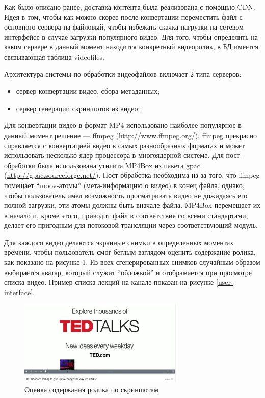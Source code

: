 Как было описано ранее, доставка контента была реализована с помощью CDN.
Идея в том, чтобы как можно скорее после конвертации переместить файл с основного сервера на файловый,
чтобы избежать скачка нагрузки на сетевом интерфейсе в случае загрузки популярного видео.
Для того, чтобы определить на каком сервере в данный момент находится конкретный видеоролик,
в БД имеется связывающая таблица videofiles.

Архитектура системы по обработки видеофайлов включает 2 типа серверов:

\begin{itemize}[wide,topsep=0pt]
  \itemsep0em
  \item сервер конвертации видео, сбора метаданных;
  \item сервер генерации скриншотов из видео;
\end{itemize}

Для конвертации видео в формат MP4 использовано наиболее популярное в данный момент решение — ffmpeg (\url{http://www.ffmpeg.org/}).
ffmpeg прекрасно справляется с конвертацией видео в самых разнообразных форматах и может использовать несколько ядер
процессора в многоядерной системе. Для пост-обработки была использована утилита MP4Box из пакета gpac (\url{http://gpac.sourceforge.net/}).
Пост-обработка необходима из-за того, что ffmpeg помещает “moov-атомы” (мета-информацию о видео) в конец файла, однако,
чтобы пользователь имел возможность просматривать видео не дожидаясь его полной загрузки, эти атомы должны быть
вначале файла. MP4Box перемещает их в начало и, кроме этого, приводит файл в соответствие со всеми стандартами,
делает его пригодным для потоковой трансляции через соответствующий модуль.

Для каждого видео делаются экранные снимки в определенных моментах времени, чтобы пользователь смог беглым взглядом
оценить содержание ролика, как показано на рисунке \ref{thumbnails}. Из всех сгенерированных снимков
случайным образом выбирается аватар, который служит “обложкой” и отображается при просмотре списка видео. Пример списка
лекций на канале показан на рисунке \ref{user-interface}.

\begin{figure}[H]
  \centering
  \includegraphics[width=0.7\textwidth]{images/thumbnails.jpg}
  \caption{Оценка содержания ролика по скриншотам}\label{thumbnails}
\end{figure}

